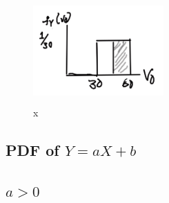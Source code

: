 
\begin{figure}[h]
\centering
\includegraphics[width=5cm, height=4cm]{images/L10/joan_drives.jpeg}
\caption{x}
\end{figure}

\subsection{PDF of \texorpdfstring{$Y=aX + b$}{Y} }


\subsection{\texorpdfstring{$a > 0$}{a}}

